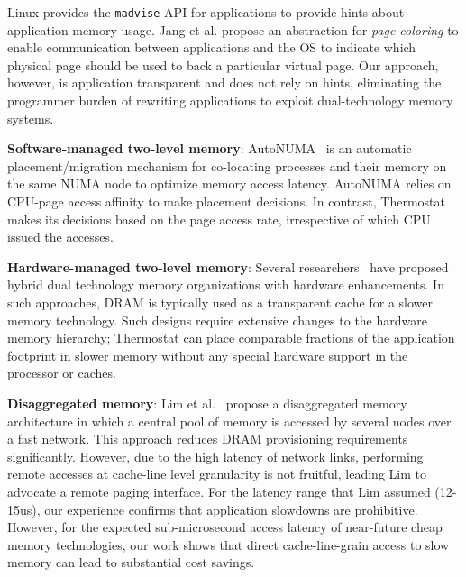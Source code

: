 Linux provides the {\tt madvise} API for applications to provide hints about application memory usage. 
Jang et al. propose an abstraction for
\textit{page coloring} to enable communication between applications and the OS
to indicate which physical page should be used to back a particular virtual page.
Our approach, however, is application transparent and does not rely on hints,
eliminating the programmer burden of rewriting applications to exploit dual-technology
memory systems.

\textbf{Software-managed two-level memory}: AutoNUMA~\cite{AUTONUMA} is an automatic
placement/migration mechanism for co-locating processes and their memory on the
same NUMA node to optimize memory access latency. AutoNUMA relies on CPU-page
access affinity to make placement decisions.  In contrast, Thermostat makes its
decisions based on the page access rate, irrespective of which CPU issued 
the accesses.

\textbf{Hardware-managed two-level memory}: Several
researchers~\cite{ref:ekman:costeffective,qureshi:twolm} have proposed hybrid
dual technology memory organizations with hardware enhancements. In such 
approaches, DRAM is typically used as a transparent cache for a slower memory technology.
Such designs require extensive changes to the hardware memory hierarchy;  Thermostat 
can place comparable fractions of the application footprint in slower memory without
any special hardware support in the processor or caches.

\textbf{Disaggregated memory}: Lim et al.~\cite{Lim2009, Lim2012} propose a
disaggregated memory architecture in which a central pool of memory is accessed
by several nodes over a fast network. This approach reduces DRAM provisioning
requirements significantly. However, due to the high latency of network links, performing
remote accesses at cache-line level granularity is not fruitful, leading Lim to advocate
a remote paging interface. For the latency range that Lim assumed (12-15us), our 
experience confirms that application slowdowns are prohibitive.  However,
for the expected sub-microsecond access latency of near-future cheap memory
technologies, our work shows that direct cache-line-grain access to slow memory
can lead to substantial cost savings.

